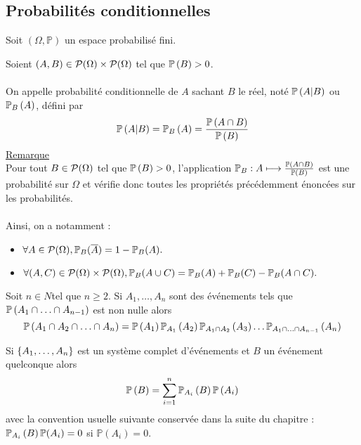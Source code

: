 \subsection{Probabilités conditionnelles}
Soit \((\Omega, \mathbb{P})\) un espace probabilisé fini.
\begin{defi}
    Soient \((A, B) \in \cal{P}(\Omega) \times \cal{P}(\Omega)\) tel que \(\proba{B} > 0\).\\~\\
    On appelle probabilité conditionnelle de \(A\) sachant \(B\) le réel, noté \(\proba{A|B} \) ou \(\probacond{A}{B}\), défini par
    \[\proba{A|B} = \probacond{A}{B} = \frac{\proba{A \inter B}}{\proba{B} }\]
    \underline{Remarque}\\
    Pour tout \(B \in \cal{P} (\Omega)\) tel que \(\proba{B} > 0\), l’application \(\mathbb{P}_{B} : A \mapsto \frac{\proba{A \inter B}}{\proba{B}}\) est une probabilité sur \(\Omega\) et vérifie donc toutes les propriétés précédemment énoncées sur les probabilités.\\~\\
    Ainsi, on a notamment :
    \begin{itemize}
        \item \(\forall A \in \cal{P} (\Omega) , \mathbb{P}_{B} (\conj{A}) = 1 - \mathbb{P}_{B} (A).\)
        \item \(\forall (A, C) \in \cal{P}(\Omega) \times \cal{P}(\Omega), \mathbb{P}_{B} (A \union C) = \mathbb{P}_{B} (A) + \mathbb{P}_{B} (C) - \mathbb{P}_{B} (A \inter C).\)
    \end{itemize}
\end{defi}
\begin{defprop}
    Soit \(n \in N \)tel que \(n \geq 2\).
    Si \(A_1, \dots , A_n\) sont des événements tels que \(\proba{A_1 \inter \dots \inter A_{n-1}}\) est non nulle alors 
    \[\proba{A_1 \inter A_2 \inter \dots \inter A_n} = \proba{A_1} \probacond{A_2}{A_1} \probacond{A_3}{A_1 \inter A_2} \dots \probacond{A_n}{A_1 \inter \dots \inter A_{n-1}}\]
\end{defprop}

\begin{defprop}
    Si \(\accol{A_1, \dots , A_n}\) est un système complet d’événements et \(B\) un événement quelconque alors
    \[\proba{B} = \sum^n_{i=1} \probacond{B}{A_i} \proba{A_i}\]
    avec la convention usuelle suivante conservée dans la suite du chapitre : \(\probacond{B}{A_i} \mathbb{P} (A_i) = 0\) si \(\mathbb{P} (A_i) = 0\).
\end{defprop}

